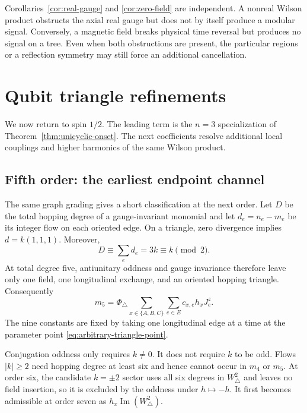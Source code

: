 \documentclass[aps,prb,preprint,nofootinbib,longbibliography]{revtex4-2}
\newcommand{\PhiTri}{\Phi_\triangle}
\begin{document}
Corollaries~\ref{cor:real-gauge} and \ref{cor:zero-field} are independent.  A
nonreal Wilson product obstructs the axial real gauge but does not by itself
produce a modular signal.  Conversely, a magnetic field breaks physical time
reversal but produces no signal on a tree.  Even when both obstructions are
present, the particular regions or a reflection symmetry may still force an
additional cancellation.





\section{Qubit triangle refinements}
\label{sec:triangle-refinements}

We now return to spin $1/2$.  The leading term is the $n=3$ specialization
of Theorem~\ref{thm:unicyclic-onset}.  The next coefficients resolve
additional local couplings and higher harmonics of the same Wilson product.

\subsection{Fifth order: the earliest endpoint channel}

The same graph grading gives a short classification at the next order.  Let
$D$ be the total hopping degree of a gauge-invariant monomial and let
$d_e=n_e-m_e$ be its integer flow on each oriented edge.  On a triangle,
zero divergence implies $d=k(1,1,1)$.  Moreover,
\begin{equation}
 D\equiv\sum_e d_e=3k\equiv k\pmod 2.
 \label{eq:flow-parity}
\end{equation}
At total degree five, antiunitary oddness and gauge invariance therefore leave
only one field, one longitudinal exchange, and an oriented hopping
triangle.  Consequently
\begin{equation}
 m_5=\PhiTri\sum_{x\in\{A,B,C\}}\sum_{e\in E}c_{x,e}h_xJ_e^z.
 \label{eq:m5-classification}
\end{equation}
The nine constants are fixed by taking one longitudinal edge at a time at the
parameter point \eqref{eq:arbitrary-triangle-point}.

Conjugation oddness only requires $k\neq0$.  It does not require $k$ to be
odd.  Flows $|k|\ge2$ need hopping degree at least six and hence cannot
occur in $m_4$ or $m_5$.  At order six, the candidate $k=\pm2$ sector uses
all six degrees in $W_\triangle^2$ and leaves no field insertion, so it is
excluded by the oddness under $h\mapsto-h$.  It first becomes admissible at
order seven as $h_x\operatorname{Im}(W_\triangle^2)$.
\end{document}
